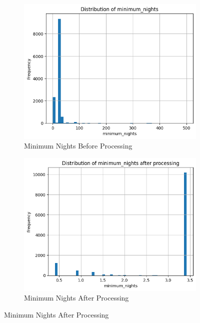 \documentclass[12pt]{article}
\begin{document}
\begin{figure}[H]
\centering
\begin{subfigure}[b]{0.48\textwidth}
    \includegraphics[width=\textwidth]{images/minimum_nights_before.png}
    \caption{Minimum Nights Before Processing}
    \label{fig:min_nights_before}
\end{subfigure}
\hfill
\begin{subfigure}[b]{0.48\textwidth}
    \includegraphics[width=\textwidth]{images/minimum_nights_after.png}
    \caption{Minimum Nights After Processing}
    \label{fig:min_nights_after}
\end{subfigure}


\end{figure}
\end{document}
